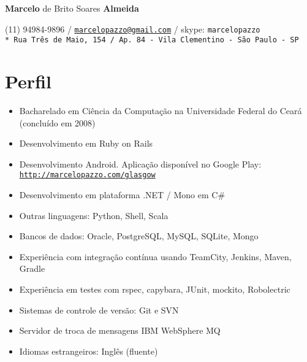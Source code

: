 \documentclass[11pt]{article}
\def\name{\textbf{Marcelo} de Brito Soares \textbf{Almeida}}
\begin{document}
\begin{flushright}

{\huge \name}

\vspace{0.05in}
(11) 94984-9896 / \href{mailto:marcelopazzo@gmail.com}{\tt marcelopazzo@gmail.com} / skype: \tt marcelopazzo
\vspace{0.01in} \\* 
Rua Três de Maio, 154 / Ap. 84 - Vila Clementino - São Paulo - SP

\end{flushright}

\section*{Perfil}
\begin{itemize}
  \item Bacharelado em Ciência da Computação na Universidade Federal do Ceará (concluído em 2008)
  \item Desenvolvimento em Ruby on Rails
  \item Desenvolvimento Android. Aplicação disponível no Google Play:
            \href{http://marcelopazzo.com/glasgow}{\tt http://marcelopazzo.com/glasgow}
  \item Desenvolvimento em plataforma .NET / Mono em C\#
  \item Outras linguagens: Python, Shell, Scala
  \item Bancos de dados: Oracle, PostgreSQL, MySQL, SQLite, Mongo
  \item Experiência com integração contínua usando TeamCity, Jenkins, Maven, Gradle
  \item Experiência em testes com rspec, capybara, JUnit, mockito, Robolectric
  \item Sistemas de controle de versão: Git e SVN
  \item Servidor de troca de mensagens IBM WebSphere MQ
  \item Idiomas estrangeiros: Inglês (fluente)
\end{itemize}
\end{document}
